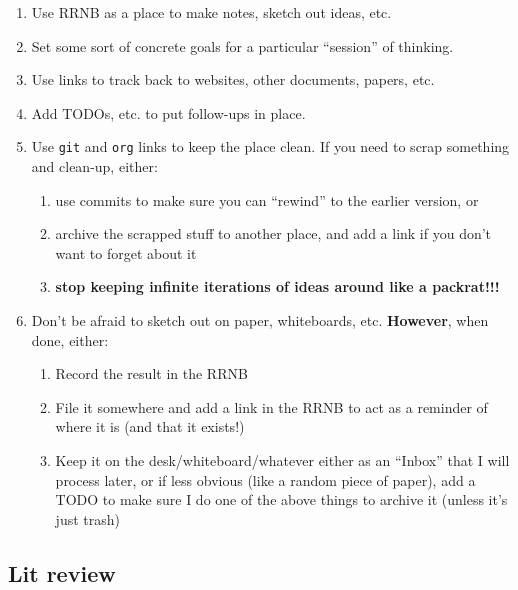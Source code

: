 \documentclass[11pt]{article}
\begin{document}
\begin{enumerate}
\item Use RRNB as a place to make notes, sketch out ideas, etc.
\item Set some sort of concrete goals for a particular ``session'' of thinking.
\item Use links to track back to websites, other documents, papers, etc.
\item Add TODOs, etc. to put follow-ups in place.
\item Use \texttt{git} and \texttt{org} links to keep the place clean. If you need to scrap something and clean-up, either:
\begin{enumerate}
\item use commits to make sure you can ``rewind'' to the earlier version, or
\item archive the scrapped stuff to another place, and add a link if you don't want to forget about it
\item \textbf{stop keeping infinite iterations of ideas around like a packrat!!!}
\end{enumerate}
\item Don't be afraid to sketch out on paper, whiteboards, etc. \textbf{However}, when done, either:
\begin{enumerate}
\item Record the result in the RRNB
\item File it somewhere and add a link in the RRNB to act as a reminder of where it is (and that it exists!)
\item Keep it on the desk/whiteboard/whatever either as an ``Inbox'' that I will process later, or if less obvious (like a random piece of paper), add a TODO to make sure I do one of the above things to archive it (unless it's just trash)
\end{enumerate}
\end{enumerate}
\subsection{Lit review}
\label{sec-4-3}
\end{document}

